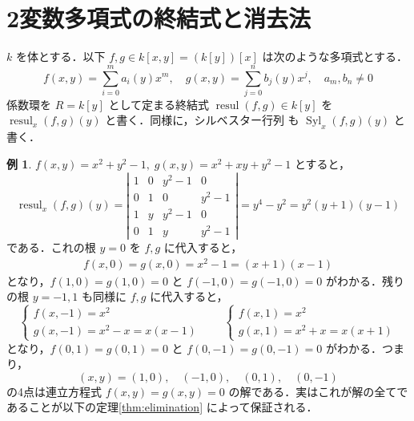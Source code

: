 \documentclass[12pt, uplatex, dvipdfmx]{jsarticle}
\theoremstyle{definition}
\newtheorem{example}{例}
\newtheorem*{remark}{注意}
\DeclareMathOperator{\Syl}{Syl}
\DeclareMathOperator{\resul}{resul}
\begin{document}



\section{2変数多項式の終結式と消去法}

$k$ を体とする．以下 $f, g \in k[x,y] = \left( k\left[ y\right]\right)[x]$ は次のような多項式とする．
\[
  f(x,y) = \sum_{i=0}^{m} a_i(y) x^m, \quad  g(x,y) = \sum_{j=0}^{n} b_j(y) x^j, \quad a_m, b_n \neq 0
\]
係数環を $R=k[y]$ として定まる終結式 $\resul(f,g) \in
k[y]$ を $\resul_x(f,g)(y)$ と書く．同様に，シルベスター行列
も $\Syl_x(f,g)(y)$ と書く．

\begin{example}
  $f(x,y)=x^2+y^2-1,\;  g(x,y)=x^2+xy+y^2-1$ とすると，
  \[
    \resul_x(f,g)(y) = \left|
      \begin{array}{cccc}
        1 & 0 & y^2-1 & 0\\
        0 & 1 & 0 & y^2-1\\
        1 & y & y^2-1 & 0\\
        0 & 1 & y & y^2-1
      \end{array}
    \right| = y^4-y^2 = y^2(y+1)(y-1)
  \]
  である．これの根 $y=0$ を $f,g$ に代入すると，
  \[
    \begin{aligned}
      f(x,0) = g(x,0) = x^2-1 = (x+1)(x-1)
    \end{aligned}
  \]
  となり，$f(1, 0) = g(1, 0) = 0$ と $f(-1,0)=g(-1,0)=0$ がわかる．残り
  の根 $y=-1, 1$ も同様に $f,g$ に代入すると，
  \[
    \begin{cases}
      f(x,-1) = x^2\\
      g(x,-1) = x^2-x=x(x-1)
    \end{cases} \qquad
    \begin{cases}
      f(x,1) = x^2\\
      g(x,1) = x^2+x=x(x+1)
    \end{cases}
  \]
  となり，$f(0, 1) = g(0, 1)=0$ と $f(0,-1)=g(0,-1)=0$ がわかる．つまり，
  \[
    (x,y) = (1,0), \quad (-1,0), \quad (0,1), \quad (0,-1)
  \]
  の4点は連立方程式 $f(x,y)=g(x,y)=0$ の解である．実はこれが解の全てで
  あることが以下の定理\ref{thm:elimination} によって保証される．
\end{example}
\end{document}
